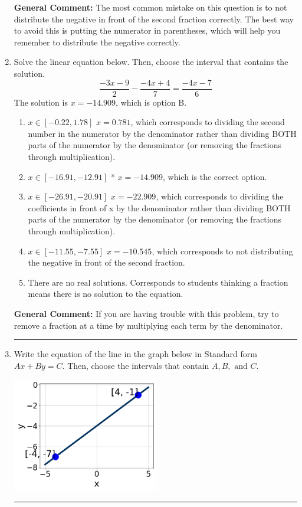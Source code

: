 \documentclass{extbook}[14pt]
\newcommand{\litem}[1]{\item #1

\rule{\textwidth}{0.4pt}}
\begin{document}
\begin{enumerate}
{\textbf{General Comment:} The most common mistake on this question is to not distribute the negative in front of the second fraction correctly. The best way to avoid this is putting the numerator in parentheses, which will help you remember to distribute the negative correctly.
}
\litem{
Solve the linear equation below. Then, choose the interval that contains the solution.
\[ \frac{-3x -9}{2} - \frac{-4x + 4}{7} = \frac{-4x -7}{6} \]
The solution is \( x = -14.909 \), which is option B.\begin{enumerate}[label=\Alph*.]
\item \( x \in [-0.22, 1.78] \)
 $x = 0.781$, which corresponds to dividing the second number in the numerator by the denominator rather than dividing BOTH parts of the numerator by the denominator (or removing the fractions through multiplication).
\item \( x \in [-16.91, -12.91] \)
* $x = -14.909$, which is the correct option.
\item \( x \in [-26.91, -20.91] \)
 $x = -22.909$, which corresponds to dividing the coefficients in front of x by the denominator rather than dividing BOTH parts of the numerator by the denominator (or removing the fractions through multiplication).
\item \( x \in [-11.55, -7.55] \)
 $x = -10.545$, which corresponds to not distributing the negative in front of the second fraction.
\item \( \text{There are no real solutions.} \)
Corresponds to students thinking a fraction means there is no solution to the equation.
\end{enumerate}

\textbf{General Comment:} If you are having trouble with this problem, try to remove a fraction at a time by multiplying each term by the denominator.
}
\litem{
Write the equation of the line in the graph below in Standard form $Ax+By=C$. Then, choose the intervals that contain $A, B, \text{ and } C$.

\begin{center}
    \includegraphics[width=0.5\textwidth]{../Figures/linearGraphToStandardCopyB.png}
\end{center}

}
\end{enumerate}
\end{document}
